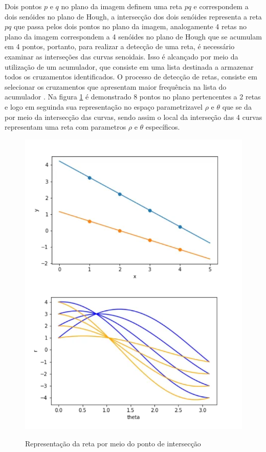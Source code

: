 Dois pontos $p$ e $q$ no plano da imagem definem uma reta $pq$ e correspondem a dois senóides no plano de Hough, a intersecção dos dois senóides representa a reta $pq$ que
passa pelos dois pontos no plano da imagem, analogamente 4 retas no plano da imagem correspondem a 4 senóides no plano de Hough que se acumulam em 4 pontos, portanto, para realizar a detecção de uma reta, é necessário examinar as interseções das curvas senoidais. Isso é alcançado por meio da utilização de um acumulador, que consiste em uma lista destinada a armazenar todos os cruzamentos identificados. O processo de detecção de retas, consiste em selecionar os cruzamentos que apresentam maior frequência na lista do acumulador \cite{transformadaHough2}. Na figura \ref{fig:Representacao da reta por meio do ponto de interseccao} é demonstrado 8 pontos no plano pertencentes a 2 retas e logo em seguinda sua representação no espaço parametrizavel $\rho$ e $\theta$ que se da por meio da intersecção das curvas, sendo assim o local da interseção das 4 curvas representam uma reta com parametros $\rho$ e $\theta$ específicos.

\begin{figure}[!htb]
	\centering
    \caption{Representação da reta por meio do ponto de intersecção}
	\includegraphics[scale=0.5]{figuras/math/senoidesIterseccao.png}
	\label{fig:Representacao da reta por meio do ponto de interseccao}
\end{figure}





